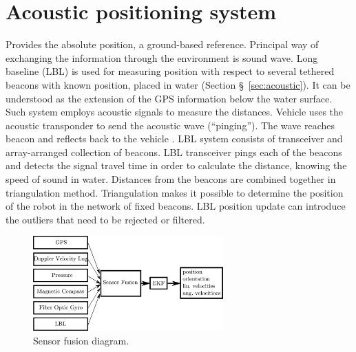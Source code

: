 \section{Acoustic positioning system}
Provides the absolute position, a ground-based reference. Principal way of exchanging the information through the environment is sound wave. Long baseline (LBL) is used for measuring position with respect to several tethered beacons with known position, placed in water (Section \S~\ref{sec:acoustic}). It can be understood as the extension of the GPS information below the water surface. Such system employs acoustic signals to measure the distances. Vehicle uses the acoustic transponder to send the acoustic wave (``pinging''). The wave reaches beacon and reflects back to the vehicle . LBL system consists of transceiver and array-arranged collection of beacons. LBL transceiver pings each of the beacons and detects the signal travel time in order to calculate the distance, knowing the speed of sound in water. Distances from the beacons are combined together in triangulation method. Triangulation makes it possible to determine the position of the robot in the network of fixed beacons. LBL position update can introduce the outliers that need to be rejected or filtered. 
\begin{figure}
  \centering
    \includegraphics[width=0.65\textwidth]{methodology/fig/fusion.eps}
  \caption{Sensor fusion diagram.}
\vspace{-10pt}
\label{fig:sensor-fusion}
\end{figure}
